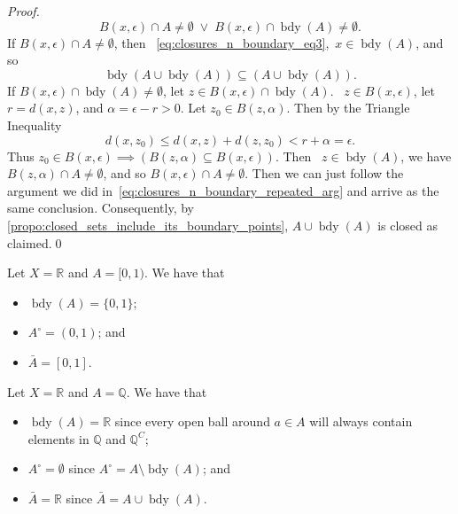\documentclass[notoc,notitlepage]{tufte-book}
\DeclareMathOperator{\bdy}{bdy }
\begin{document}
\begin{proof}
  \begin{equation*}
    B(x, \epsilon) \cap A \neq \emptyset \; \lor \; B(x, \epsilon) \cap \bdy(A) \neq \emptyset.
  \end{equation*}
  If $B(x, \epsilon) \cap A \neq \emptyset$, then \because~\eqref{eq:closures_n_boundary_eq3},\ $x \in \bdy(A)$, and so
  \begin{equation}\tag{$\dagger$}\label{eq:closures_n_boundary_repeated_arg}
    \bdy( A \cup \bdy(A) ) \subseteq ( A \cup \bdy(A) ).
  \end{equation}
  If $B(x, \epsilon) \cap \bdy(A) \neq \emptyset$, let $z \in B(x, \epsilon) \cap \bdy(A)$. \because\ $z \in B(x, \epsilon)$, let $r = d(x, z)$, and $\alpha = \epsilon - r > 0$. Let $z_0 \in B(z, \alpha)$. Then by the Triangle Inequality
  \begin{equation*}
    d(x, z_0) \leq d(x, z) + d(z, z_0) < r + \alpha = \epsilon.
  \end{equation*}
  Thus $z_0 \in B(x, \epsilon) \implies ( B(z, \alpha) \subseteq B(x, \epsilon) )$. Then \because\ $z \in \bdy(A)$, we have $B(z, \alpha) \cap A \neq \emptyset$, and so $B(x, \epsilon) \cap A \neq \emptyset$. Then we can just follow the argument we did in~\eqref{eq:closures_n_boundary_repeated_arg} and arrive as the same conclusion. Consequently, by \cref{propo:closed_sets_include_its_boundary_points}, $A \cup \bdy(A)$ is closed as claimed.\qed\
\end{proof}

\begin{eg}
  Let $X = \mathbb{R}$ and $A = [0, 1)$. We have that
  \begin{itemize}
    \item $\bdy(A) = \{0, 1\}$;
    \item $A^\circ = (0, 1)$; and
    \item $\bar{A} = [0, 1]$.
  \end{itemize}
\end{eg}

\begin{eg}\label{eg:bdy_interior_n_closure_of_q}
  Let $X = \mathbb{R}$ and $A = \mathbb{Q}$. We have that
  \begin{itemize}
    \item $\bdy(A) = \mathbb{R}$ since every open ball around $a \in A$ will always contain elements in $\mathbb{Q}$ and ${\mathbb{Q}}^C$;
    \item $A^\circ = \emptyset$ since $A^\circ = A \setminus \bdy(A)$; and
    \item $\bar{A} = \mathbb{R}$ since $\bar{A} = A \cup \bdy(A)$.
  \end{itemize}
\end{eg}
\end{document}
